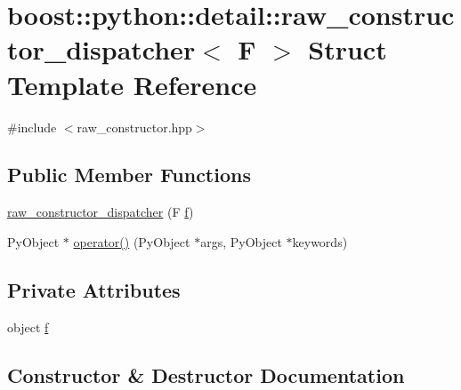 \hypertarget{structboost_1_1python_1_1detail_1_1raw__constructor__dispatcher}{}\section{boost\+:\+:python\+:\+:detail\+:\+:raw\+\_\+constructor\+\_\+dispatcher$<$ F $>$ Struct Template Reference}
\label{structboost_1_1python_1_1detail_1_1raw__constructor__dispatcher}


{\ttfamily \#include $<$raw\+\_\+constructor.\+hpp$>$}

\subsection*{Public Member Functions}
\begin{DoxyCompactItemize}
\item 
\hyperlink{structboost_1_1python_1_1detail_1_1raw__constructor__dispatcher_a24c048cfc2d50e1897e6a779eef33f5c}{raw\+\_\+constructor\+\_\+dispatcher} (F \hyperlink{structboost_1_1python_1_1detail_1_1raw__constructor__dispatcher_a055de51d7e8492c050508aa131ec1dd5}{f})
\item 
Py\+Object $\ast$ \hyperlink{structboost_1_1python_1_1detail_1_1raw__constructor__dispatcher_ae3fe9c3c2b28ec59a57468fc05381a96}{operator()} (Py\+Object $\ast$args, Py\+Object $\ast$keywords)
\end{DoxyCompactItemize}
\subsection*{Private Attributes}
\begin{DoxyCompactItemize}
\item 
object \hyperlink{structboost_1_1python_1_1detail_1_1raw__constructor__dispatcher_a055de51d7e8492c050508aa131ec1dd5}{f}
\end{DoxyCompactItemize}


\subsection{Constructor \& Destructor Documentation}
